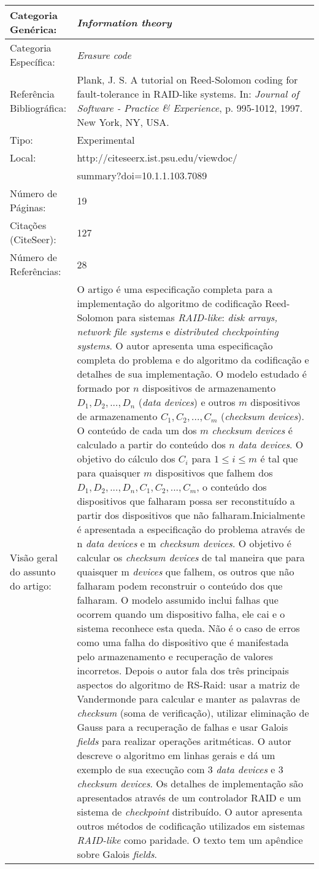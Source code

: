 \documentclass[10pt,a4paper]{article}
\begin{document}
\begin{center}
\begin{tabular}{|p{5cm}||p{10cm}|}
\hline

Categoria Genérica: & \emph{Information theory}\\\hline
Categoria Específica: & \emph{Erasure code}\\\hline
Referência Bibliográfica: & Plank, J. S. A tutorial on Reed-Solomon coding for fault-tolerance in RAID-like systems. In:  \emph{Journal of Software - Practice \& Experience}, p. 995-1012, 1997. New York, NY, USA. \\\hline
Tipo: & Experimental\\\hline
Local: & http://citeseerx.ist.psu.edu/viewdoc/\\ &summary?doi=10.1.1.103.7089\\\hline
Número de Páginas: & 19\\\hline
Citações (CiteSeer): & 127\\\hline
Número de Referências: & 28\\\hline
Visão geral do assunto do artigo: & O artigo é uma especificação completa para a implementação do algoritmo de codificação Reed-Solomon para sistemas \emph{RAID-like}: \emph{disk arrays, network file systems} e \emph{distributed checkpointing systems}. O autor apresenta uma especificação completa do problema e do algoritmo da codificação e detalhes de sua implementação. O modelo estudado é formado por $n$ dispositivos de armazenamento  $D_1, D_2, ..., D_n$ (\emph{data devices}) e outros $m$ dispositivos de armazenamento  $C_1, C_2, ..., C_m$ (\emph{checksum devices}). O conteúdo de cada um dos $m$ \emph{checksum devices} é calculado a partir do conteúdo dos $n$ \emph{data devices}. O objetivo do cálculo dos $C_i$ para $1 \leq i \leq m$ é tal que para quaisquer $m$ dispositivos que falhem dos $D_1, D_2, ..., D_n, C_1, C_2, ..., C_m$, o conteúdo dos dispositivos que falharam possa ser reconstituído a partir dos dispositivos que não falharam.Inicialmente é apresentada a especificação do problema através de n \emph{data devices} e m \emph{checksum devices}. O objetivo é calcular os \emph{checksum devices} de tal maneira que para quaisquer m \emph{devices} que falhem, os outros que não falharam podem reconstruir o conteúdo dos que falharam. O modelo assumido inclui falhas que ocorrem quando um dispositivo falha, ele cai e o sistema reconhece esta queda. Não é o caso de erros como uma falha do dispositivo que é manifestada pelo armazenamento e recuperação de valores incorretos. Depois o autor fala dos três principais aspectos do algoritmo de RS-Raid: usar a matriz de Vandermonde para calcular e manter as palavras de \emph{checksum} (soma de verificação), utilizar eliminação de Gauss para a recuperação de falhas e usar Galois \emph{fields} para realizar operações aritméticas. O autor descreve o algoritmo em linhas gerais e dá um exemplo de sua execução com  $3$ \emph{data devices} e $3$ \emph{checksum devices}. Os detalhes de implementação são apresentados através de um controlador RAID e um sistema de \emph{checkpoint} distribuído. O autor apresenta outros métodos de codificação utilizados em sistemas \emph{RAID-like} como paridade. O texto tem um apêndice sobre Galois \emph{fields}. \\\hline

\end{tabular}
\end{center}
\end{document}
